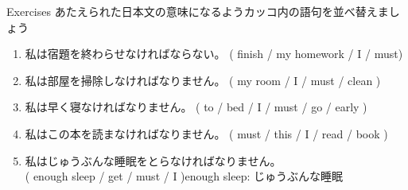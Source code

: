 \documentclass[aspectratio=169,xcolor={dvipsnames,table}]{beamer}
\newcommand{\myaudio}[1]{\href{#1}{\faVolumeUp}}
\begin{document}
\begin{frame}[plain]{Exercises}
あたえられた日本文の意味になるようカッコ内の語句を並べ替えましょう\hfill{\myaudio{./audio/013_must_02.mp3}}
\begin{enumerate}
 \item 私は宿題を終わらせなければならない。
( finish / my homework / I / must)\\
 \item 私は部屋を掃除しなければなりません。
( my room / I / must / clean )\\
 \item 私は早く寝なければなりません。
( to / bed / I / must / go / early )\\
 \item 私はこの本を読まなければなりません。
( must / this / I / read / book )\\
 \item 私はじゅうぶんな睡眠をとらなければなりません。\\
( enough sleep / get / must / I )\hfill{\footnotesize enough sleep: じゅうぶんな睡眠}\\
\end{enumerate}
\end{frame}
\end{document}
